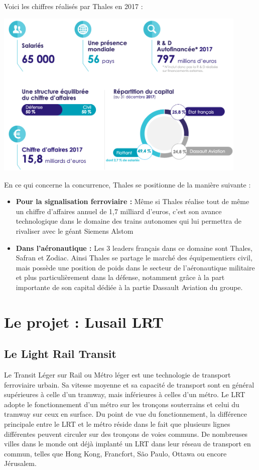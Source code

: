Voici les chiffres réalisés par Thales en 2017 :

\begin{center}
\includegraphics[height=8cm]{ressources/images/figures/Key.png}
\end{center}

En ce qui concerne la concurrence, Thales se positionne de la manière suivante :
\begin{itemize}
\item \textbf{Pour la signalisation ferroviaire :} Même si Thales réalise tout de même un chiffre d'affaires annuel de 1,7 milliard d'euros, c'est son avance technologique dans le domaine des trains autonomes qui lui permettra de rivaliser avec le géant Siemens Alstom
\item \textbf{Dans l'aéronautique :} Les 3 leaders français dans ce domaine sont Thales, Safran et Zodiac. Ainsi Thales se partage le marché des équipementiers civil, mais possède une position de poids dans le secteur de l'aéronautique militaire et plus particulièrement dans la défense, notamment grâce à la part importante de son capital dédiée à la partie Dassault Aviation du groupe.
\end{itemize}

\section{Le projet : Lusail LRT}
\subsection{Le Light Rail Transit} Le Transit Léger sur Rail ou Métro léger est une technologie de transport ferroviaire urbain. Sa vitesse moyenne et sa capacité de transport sont en général supérieures à celle d'un tramway, mais inférieures à celles d'un métro. Le \gls{LRT} adopte le fonctionnement d'un métro sur les tronçons souterrains et celui du tramway sur ceux en surface.
Du point de vue du fonctionnement, la différence principale entre le \gls{LRT} et le métro réside dans le fait que plusieurs lignes différentes peuvent circuler sur des tronçons de voies communs.
De nombreuses villes dans le monde ont déjà implanté un  \gls{LRT} dans leur réseau de transport en commun, telles que Hong Kong, Francfort, São Paulo, Ottawa ou encore Jérusalem.

